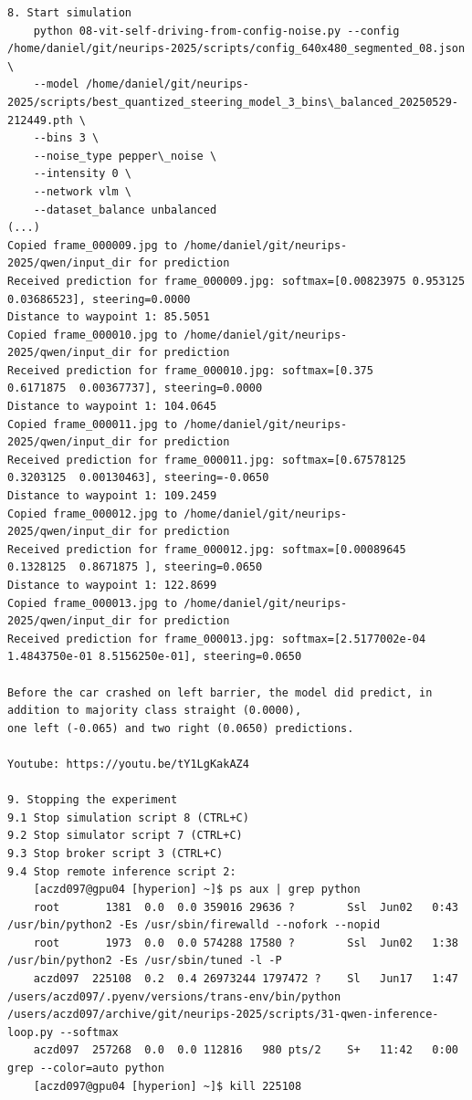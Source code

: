 \begin{verbatim}
8. Start simulation
    python 08-vit-self-driving-from-config-noise.py --config /home/daniel/git/neurips-2025/scripts/config_640x480_segmented_08.json \
    --model /home/daniel/git/neurips-2025/scripts/best_quantized_steering_model_3_bins\_balanced_20250529-212449.pth \
    --bins 3 \
    --noise_type pepper\_noise \
    --intensity 0 \
    --network vlm \
    --dataset_balance unbalanced
(...)
Copied frame_000009.jpg to /home/daniel/git/neurips-2025/qwen/input_dir for prediction
Received prediction for frame_000009.jpg: softmax=[0.00823975 0.953125   0.03686523], steering=0.0000
Distance to waypoint 1: 85.5051
Copied frame_000010.jpg to /home/daniel/git/neurips-2025/qwen/input_dir for prediction
Received prediction for frame_000010.jpg: softmax=[0.375      0.6171875  0.00367737], steering=0.0000
Distance to waypoint 1: 104.0645
Copied frame_000011.jpg to /home/daniel/git/neurips-2025/qwen/input_dir for prediction
Received prediction for frame_000011.jpg: softmax=[0.67578125 0.3203125  0.00130463], steering=-0.0650
Distance to waypoint 1: 109.2459
Copied frame_000012.jpg to /home/daniel/git/neurips-2025/qwen/input_dir for prediction
Received prediction for frame_000012.jpg: softmax=[0.00089645 0.1328125  0.8671875 ], steering=0.0650
Distance to waypoint 1: 122.8699
Copied frame_000013.jpg to /home/daniel/git/neurips-2025/qwen/input_dir for prediction
Received prediction for frame_000013.jpg: softmax=[2.5177002e-04 1.4843750e-01 8.5156250e-01], steering=0.0650

Before the car crashed on left barrier, the model did predict, in addition to majority class straight (0.0000),
one left (-0.065) and two right (0.0650) predictions.

Youtube: https://youtu.be/tY1LgKakAZ4

9. Stopping the experiment
9.1 Stop simulation script 8 (CTRL+C)
9.2 Stop simulator script 7 (CTRL+C)
9.3 Stop broker script 3 (CTRL+C)
9.4 Stop remote inference script 2:
    [aczd097@gpu04 [hyperion] ~]$ ps aux | grep python
    root       1381  0.0  0.0 359016 29636 ?        Ssl  Jun02   0:43 /usr/bin/python2 -Es /usr/sbin/firewalld --nofork --nopid
    root       1973  0.0  0.0 574288 17580 ?        Ssl  Jun02   1:38 /usr/bin/python2 -Es /usr/sbin/tuned -l -P
    aczd097  225108  0.2  0.4 26973244 1797472 ?    Sl   Jun17   1:47 /users/aczd097/.pyenv/versions/trans-env/bin/python /users/aczd097/archive/git/neurips-2025/scripts/31-qwen-inference-loop.py --softmax
    aczd097  257268  0.0  0.0 112816   980 pts/2    S+   11:42   0:00 grep --color=auto python
    [aczd097@gpu04 [hyperion] ~]$ kill 225108


\end{verbatim}
